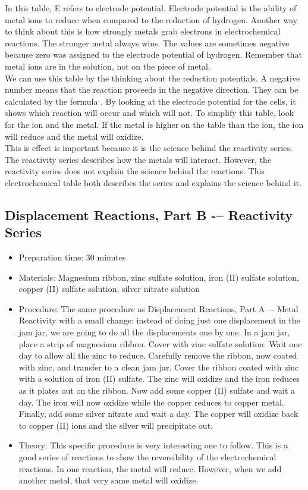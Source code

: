 \begin{itemize}
{In this table, E refers to electrode potential. Electrode potential is the ability of metal ions to reduce when compared to the reduction of hydrogen. Another way to think about this is how strongly metals grab electrons in electrochemical reactions. The stronger metal always wins. The values are sometimes negative because zero was assigned to the electrode potential of hydrogen. Remember that metal ions are in the solution, not on the piece of metal.\\
We can use this table by the thinking about the reduction potentials. A negative number means that the reaction proceeds in the negative direction. They can be calculated by the formula . By looking at the electrode potential for the cells, it shows which reaction will occur and which will not. To simplify this table, look for the ion and the metal. If the metal is higher on the table than the ion, the ion will reduce and the metal will oxidize.\\
This is effect is important because it is the science behind the reactivity series. The reactivity series describes how the metals will interact. However, the reactivity series does not explain the science behind the reactions. This electrochemical table both describes the series and explains the science behind it.}
\end{itemize}

\subsection{Displacement Reactions, Part B -– Reactivity Series}
\begin{itemize}
\item{Preparation time: 30 minutes}
\item{Materials: Magnesium ribbon, zinc sulfate solution, iron (II) sulfate solution, copper (II) sulfate solution, silver nitrate solution}
\item{Procedure: The same procedure as Displacement Reactions, Part A –- Metal Reactivity with a small change: instead of doing just one displacement in the jam jar, we are going to do all the displacements one by one. In a jam jar, place a strip of magnesium ribbon. Cover with zinc sulfate solution. Wait one day to allow all the zinc to reduce. Carefully remove the ribbon, now coated with zinc, and transfer to a clean jam jar. Cover the ribbon coated with zinc with a solution of iron (II) sulfate. The zinc will oxidize and the iron reduces as it plates out on the ribbon. Now add some copper (II) sulfate and wait a day. The iron will now oxidize while the copper reduces to copper metal. Finally, add some silver nitrate and wait a day. The copper will oxidize back to copper (II) ions and the silver will precipitate out.}
\item{Theory: This specific procedure is very interesting one to follow. This is a good series of reactions to show the reversibility of the electrochemical reactions. In one reaction, the metal will reduce. However, when we add another metal, that very same metal will oxidize.}
\end{itemize}

